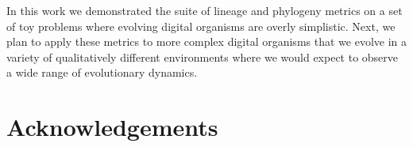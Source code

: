 \documentclass[letterpaper]{article}
\begin{document}
In this work we demonstrated the suite of lineage and phylogeny metrics on a set of toy problems where evolving digital organisms are overly simplistic. Next, we plan to apply these metrics to more complex digital organisms that we evolve in a variety of qualitatively different environments where we would expect to observe a wide range of evolutionary dynamics. 

\section{Acknowledgements}




\setlength{\bibsep}{2pt}

\footnotesize

\end{document}
